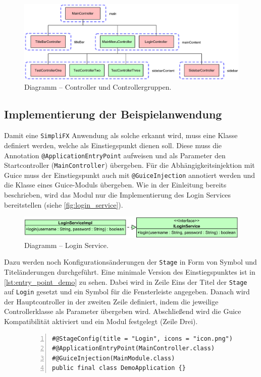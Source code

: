 \begin{figure}[H]
	\centering
	\includegraphics[width=\textwidth]{Abbildungen/Controller Relations.png}
	\caption{Diagramm -- Controller und Controllergruppen.}
	\label{fig:controller_relations}
\end{figure}
\subsection{Implementierung der Beispielanwendung}
Damit eine \texttt{SimpliFX} Anwendung als solche erkannt wird, muss eine Klasse definiert werden, welche als Einstiegspunkt dienen soll. Diese muss die Annotation \texttt{@ApplicationEntryPoint} aufweisen und als Parameter den Startcontroller (\texttt{MainController}) übergeben. Für die Abhängigkeitsinjektion mit Guice muss der Einstiegspunkt auch mit \texttt{@GuiceInjection} annotiert werden und die Klasse eines Guice-Moduls übergeben. Wie in der Einleitung bereits beschrieben, wird das Modul nur die Implementierung des Login Services bereitstellen (siehe \autoref{fig:login_service}). 
\begin{figure}[H]
	\centering
	\includegraphics[width=\textwidth]{Abbildungen/Login Service.png}
	\caption{Diagramm -- Login Service.}
	\label{fig:login_service}
\end{figure}
\noindent Dazu werden noch Konfigurationsänderungen der \texttt{Stage} in Form von Symbol und Titeländerungen durchgeführt. Eine minimale Version des Einstiegspunktes ist in \autoref{lst:entry_point_demo} zu sehen. Dabei wird in Zeile Eins der Titel der \texttt{Stage} auf \texttt{Login} gesetzt und ein Symbol für die Fensterleiste angegeben. Danach wird der Hauptcontroller in der zweiten Zeile definiert, indem die jeweilige Controllerklasse als Parameter übergeben wird. Abschließend wird die Guice Kompatibilität aktiviert und ein Modul festgelegt (Zeile Drei).
\begin{figure}[H]
	\begin{lstlisting}[caption=Demo -- Minimaler Einstiegspunkt., captionpos=b, label=lst:entry_point_demo, numbers=left, xleftmargin=1.5em, framexleftmargin=1.5em]
#@StageConfig(title = "Login", icons = "icon.png")
#@ApplicationEntryPoint(MainController.class)
#@GuiceInjection(MainModule.class)
public final class DemoApplication {}
	\end{lstlisting}
\end{figure}
